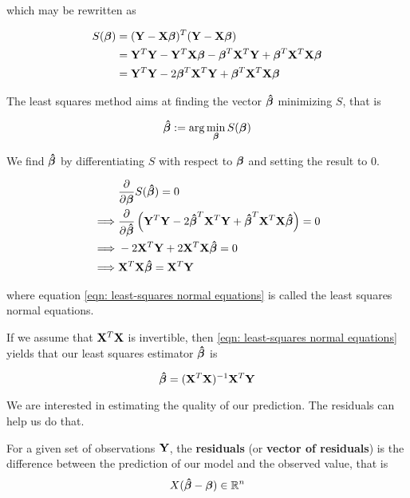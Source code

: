 which may be rewritten as

\begin{align*}
    S(\boldsymbol{\beta}) & = (\mathbf{Y} - \mathbf{X} \boldsymbol{\beta})^{T} (\mathbf{Y} - \mathbf{X} \boldsymbol{\beta})                             \\
            & = \mathbf{Y}^T \mathbf{Y} - \mathbf{Y}^T \mathbf{X} \boldsymbol{\beta} - \boldsymbol{\beta}^T \mathbf{X}^T \mathbf{Y} + \boldsymbol{\beta}^T \mathbf{X}^T \mathbf{X} \boldsymbol{\beta} \\
            & = \mathbf{Y}^T \mathbf{Y} - 2 \boldsymbol{\beta}^T \mathbf{X}^T \mathbf{Y} + \boldsymbol{\beta}^T \mathbf{X}^T \mathbf{X} \boldsymbol{\beta}              \\
\end{align*}

The least squares method aims at finding the vector $\boldsymbol{\hat{\beta}}$ minimizing \( S \), that is

\[
    \boldsymbol{\hat{\beta}} := \arg \min_{\boldsymbol{\beta}} S(\boldsymbol{\beta})
\]


We find \( \boldsymbol{\hat{\beta}} \) by differentiating \( S \) with respect to $\boldsymbol{\beta}$ and setting the result to 0.

\begin{align}
             & \frac{\partial}{\partial \boldsymbol{\beta}} S(\boldsymbol{\hat{\beta}}) = 0 \nonumber                                                                  \\
    \implies & \frac{\partial}{\partial \boldsymbol{\hat{\beta}}} \left( \mathbf{Y}^T \mathbf{Y} - 2 \boldsymbol{\hat{\beta}}^T \mathbf{X}^T \mathbf{Y} + \boldsymbol{\hat{\beta}}^T \mathbf{X}^T \mathbf{X} \boldsymbol{\hat{\beta}} \right) = 0 \nonumber \\
    \implies & - 2 \mathbf{X}^T \mathbf{Y} + 2 \mathbf{X}^T \mathbf{X} \boldsymbol{\hat{\beta}} = 0 \nonumber                                                                            \\
    \implies & \mathbf{X}^T \mathbf{X} \boldsymbol{\hat{\beta}} = \mathbf{X}^T \mathbf{Y} \label{eqn: least-squares normal equations}
\end{align}

where equation \eqref{eqn: least-squares normal equations} is called the least squares normal equations.

If we assume that \( \mathbf{X}^T \mathbf{X} \) is invertible, then \eqref{eqn: least-squares normal equations} yields that our least squares estimator \( \boldsymbol{\hat{\beta}} \) is

\begin{equation}
    \label{eqn: least squares estimator}
    \boldsymbol{\hat{\beta}} = (\mathbf{X}^T \mathbf{X})^{-1} \mathbf{X}^T \mathbf{Y}
\end{equation}

We are interested in estimating the quality of our prediction. The residuals can help us do that.

\begin{definition}[Residuals]
    For a given set of observations \(\mathbf{Y}\), the \textbf{residuals} (or \textbf{vector of residuals}) is the difference between the prediction of our model and the observed value, that is
    \[
        X (\boldsymbol{\hat{\beta}} - \boldsymbol{\beta}) \in \mathbb{R}^n
    \]
\end{definition}

